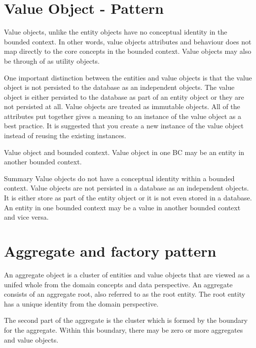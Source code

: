 \section{Value Object - Pattern}

Value objects, unlike the entity objects have no conceptual identity in the bounded context.
In other words, value objects attributes and behaviour does not map directly to the core concepts in the bounded context.
Value objects may also be through of as utility objects. %

One important distinction between the entities and value objects is that the value object is not persisted to the database as an independent objects.
The value object is either persisted to the database as part of an entity object or they are not persisted at all.
Value objects are treated as immutable objects.
All of the attributes put together gives a meaning to an instance of the value object as a best practice.
It is suggested that you create a new instance of the value object instead of reusing the existing instances.

Value object and bounded context.
Value object in one BC may be an entity in another bounded context.

Summary
Value objects do not have a conceptual identity within a bounded context.
Value objects are not persisted in a database as an independent objects.
It is either store as part of the entity object or it is not even stored in a database.
An entity in one bounded context may be a value in another bounded context and vice versa.


\section{Aggregate and factory pattern}
An aggregate object is a cluster of entities and value objects that are viewed as a unifed whole from the domain concepts and data perspective.
An aggregate consists of an aggregate root, also referred to as the root entity.
The root entity has a unique identity from the domain perspective.

The second part of the aggregate is the cluster which is formed by the boundary for the aggregate.
Within this boundary, there may be zero or more aggregates and value objects.

